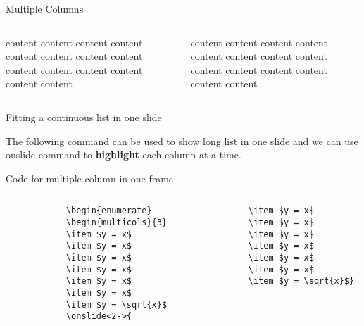 \documentclass[10pt,xcolor=x11names]{beamer}
\begin{document}
\begin{frame}{Multiple Columns}
\vspace{15pt}

\begin{columns}
content content content content content content content 
content content content content content content content 

content content content content content content content 
content content content content content content content 

\end{columns}

\end{frame}

\begin{frame}[containsverbatim]{ Fitting a continuous list in one slide} \vspace{-10pt}

The following command can be used to show long list in one slide and we can use \alert{onslide} command to \textbf{highlight} each column at a time. \vspace{10pt}

\begin{exampleblock}{Code for multiple column in one frame }
	
	
	\begin{columns}
		
		\begin{column}[t]{3cm}
			\begin{verbatim}
			\begin{enumerate}
			\begin{multicols}{3}
			\item $y = x$
			\item $y = x$
			\item $y = x$
			\item $y = x$
			\item $y = x$
			\item $y = x$
			\item $y = \sqrt{x}$
			\onslide<2->{       
			\end{verbatim}	
		\end{column}
		
		\begin{column}[t]{3cm}
			
			\begin{verbatim}
			\item $y = x$
			\item $y = x$
			\item $y = x$
			\item $y = x$
			\item $y = x$
			\item $y = x$
			\item $y = \sqrt{x}$}
			\end{verbatim}
		\end{column}
		

\end{columns}
\end{exampleblock}
\end{frame}
\end{document}
